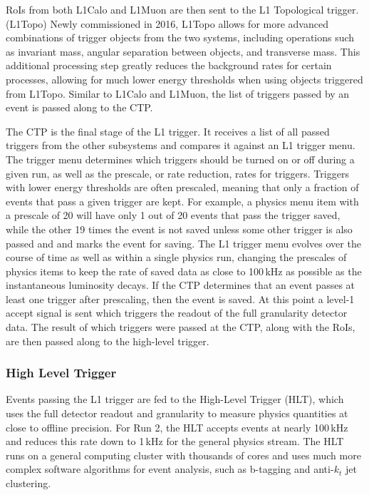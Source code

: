 RoIs from both L1Calo and L1Muon are then sent to the L1 Topological trigger. (L1Topo)  Newly commissioned in 2016, L1Topo allows for more advanced combinations of trigger objects from the two systems, including operations such as invariant mass, angular separation between objects, and transverse mass.\cite{L1Topo}  This additional processing step greatly reduces the background rates for certain processes, allowing for much lower energy thresholds when using objects triggered from L1Topo.  Similar to L1Calo and L1Muon, the list of triggers passed by an event is passed along to the CTP.

The CTP is the final stage of the L1 trigger.  It receives a list of all passed triggers from the other subsystems and compares it against an L1 trigger menu.  The trigger menu determines which triggers should be turned on or off during a given run, as well as the prescale, or rate reduction, rates for triggers.  Triggers with lower energy thresholds are often prescaled, meaning that only a fraction of events that pass a given trigger are kept.  For example, a physics menu item with a prescale of 20 will have only 1 out of 20 events that pass the trigger saved, while the other 19 times the event is not saved unless some other trigger is also passed and and marks the event for saving.  The L1 trigger menu evolves over the course of time as well as within a single physics run, changing the prescales of physics items to keep the rate of saved data as close to 100\,kHz as possible as the instantaneous luminosity decays.  If the CTP determines that an event passes at least one trigger after prescaling, then the event is saved.  At this point a level-1 accept signal is sent which triggers the readout of the full granularity detector data.  The result of which triggers were passed at the CTP, along with the RoIs, are then passed along to the high-level trigger.

\subsubsection{High Level Trigger}

Events passing the L1 trigger are fed to the High-Level Trigger (HLT), which uses the full detector readout and granularity to measure physics quantities at close to offline precision.  For Run 2, the HLT accepts events at nearly 100\,kHz and reduces this rate down to 1\,kHz for the general physics stream.  The HLT runs on a general computing cluster with thousands of cores and uses much more complex software algorithms for event analysis, such as b-tagging and anti-$k_t$ jet clustering.

